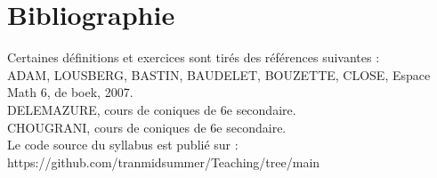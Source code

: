 \documentclass[french, 12pt]{article}
\begin{document}



\newpage

\newpage
\tableofcontents






%

\section{Bibliographie}
Certaines définitions et exercices sont tirés des références suivantes :\\

ADAM, LOUSBERG, BASTIN, BAUDELET, BOUZETTE, CLOSE, Espace Math 6, de boek, 2007.\\
DELEMAZURE, cours de coniques de 6e secondaire.\\
CHOUGRANI, cours de coniques de 6e secondaire.\\

Le code source du syllabus est publié sur : https://github.com/tranmidsummer/Teaching/tree/main 
\end{document}
